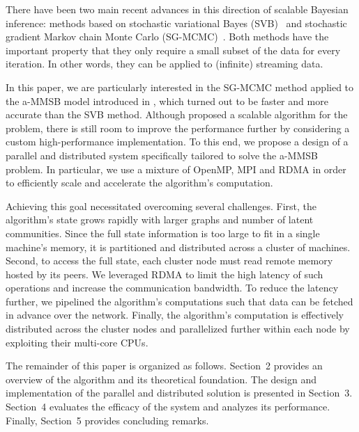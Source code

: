 There have been two main recent advances in this direction of scalable Bayesian inference: methods based on stochastic variational Bayes (SVB)~\cite{hoffman2013stochastic,gopalan2013efficient,gopalan2012scalable} and stochastic gradient Markov chain Monte Carlo (SG-MCMC)~\cite{welling2011bayesian,patterson2013stochastic,ahn2014distributed,ahn2012bayesian}. Both methods have the important property that they only require a small subset of the data for every iteration. In other words, they can be applied to (infinite) streaming data.

In this paper, we are particularly interested in the SG-MCMC method applied to the a-MMSB model introduced in \cite{LiAW15}, which turned out to be faster and more accurate than the SVB method. Although \cite{LiAW15} proposed a scalable algorithm for the problem, there is still room to improve the performance further by considering a custom high-performance implementation. To this end, we propose a design of a parallel and distributed system specifically tailored to solve the a-MMSB problem. In particular, we use a mixture of OpenMP, MPI and RDMA in order to efficiently scale and accelerate the algorithm's computation.

Achieving this goal necessitated overcoming several challenges. First, the algorithm's state grows rapidly with larger graphs and number of latent communities. Since the full state information is too large to fit in a single machine's memory, it is partitioned and distributed across a cluster of machines. Second, to access the full state, each cluster node must read remote memory hosted by its peers. We leveraged RDMA to limit the high latency of such operations and increase the communication bandwidth. To reduce the latency further, we pipelined the algorithm's computations such that data can be fetched in advance over the network. Finally, the algorithm's computation is effectively distributed across the cluster nodes and parallelized further within each node by exploiting their multi-core CPUs.

The remainder of this paper is organized as follows. Section~2 provides an overview of the algorithm and its theoretical foundation. The design and implementation of the parallel and distributed solution is presented in Section~3. Section~4 evaluates the efficacy of the system and analyzes its performance. Finally, Section~5 provides concluding remarks.



